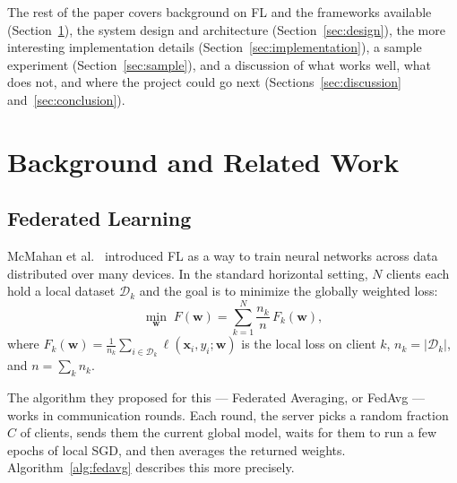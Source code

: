\documentclass[conference]{IEEEtran}
\begin{document}
The rest of the paper covers background on FL and the frameworks available
(Section~\ref{sec:background}), the system design and architecture
(Section~\ref{sec:design}), the more interesting implementation details
(Section~\ref{sec:implementation}), a sample experiment
(Section~\ref{sec:sample}), and a discussion of what works well,
what does not, and where the project could go next
(Sections~\ref{sec:discussion} and~\ref{sec:conclusion}).

\section{Background and Related Work}
\label{sec:background}

\subsection{Federated Learning}

McMahan et al.~\cite{mcmahan2017communication} introduced FL as a way to
train neural networks across data distributed over many devices.
In the standard horizontal setting, $N$ clients each hold a local
dataset $\mathcal{D}_k$ and the goal is to minimize the globally
weighted loss:
\begin{equation}
  \min_{\mathbf{w}} \; F(\mathbf{w}) = \sum_{k=1}^{N} \frac{n_k}{n} \, F_k(\mathbf{w}),
  \label{eq:fl_obj}
\end{equation}
where $F_k(\mathbf{w}) = \frac{1}{n_k}\sum_{i \in \mathcal{D}_k}
\ell(\mathbf{x}_i, y_i; \mathbf{w})$ is the local loss on client $k$,
$n_k = |\mathcal{D}_k|$, and $n = \sum_k n_k$.

The algorithm they proposed for this --- Federated Averaging, or
FedAvg --- works in communication rounds.
Each round, the server picks a random fraction $C$ of clients, sends
them the current global model, waits for them to run a few epochs of
local SGD, and then averages the returned weights.
Algorithm~\ref{alg:fedavg} describes this more precisely.
\end{document}
